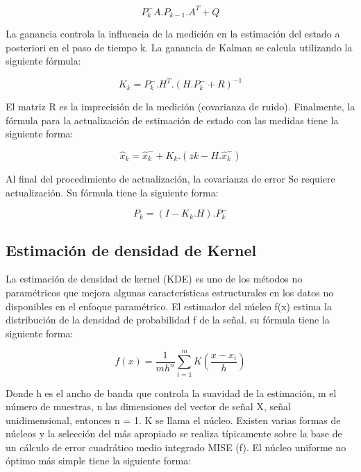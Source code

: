 \documentclass[10pt,a4paper]{article}
\begin{document}
\begin{equation}
P_{k}^{-} A.P_{k-1}.A^{T}+Q
\end{equation}

La ganancia controla la influencia de la medición en la estimación del estado a posteriori en el paso de tiempo k. La ganancia de Kalman se calcula utilizando la siguiente fórmula:

\begin{equation}
K_{k}=P_{k}^{-}.H^{T}.(H.P_{k}^{-}+R)^{-1}
\end{equation}

El matriz R es la imprecisión de la medición (covarianza de ruido).  Finalmente, la fórmula para la actualización de estimación de estado con las medidas tiene la siguiente forma:

\begin{equation}
\widehat{x}_{k} = \widehat{x} _{k}^{-} + K_{k}.(zk-H.\widehat{x}_{k}^{-})
\end{equation}

Al final del procedimiento de actualización, la covarianza de error
Se requiere actualización. Su fórmula tiene la siguiente forma:

\begin{equation}
P_{k}=(I-K_{k}.H).P_{k}^{-}
\end{equation}


\subsection{Estimación de densidad de Kernel }

La estimación de densidad de kernel (KDE) es uno de los métodos no paramétricos que mejora algunas características estructurales en los datos no disponibles en el enfoque paramétrico. El estimador del núcleo f(x) estima la distribución de la densidad de probabilidad f de la señal. su fórmula tiene la siguiente forma:

\begin{equation}
\widehat{f}(x)= \frac{1}{mh^{n}}\sum_{i=1}^{m} K(\frac{x-x_{i}}{h})
\end{equation}

Donde h es el ancho de banda que controla la suavidad de la estimación, m el número de muestras, n las dimensiones del vector de señal X, señal unidimensional, entonces n = 1. K se llama el núcleo. Existen varias formas de núcleos y la selección del más apropiado se realiza típicamente sobre la base de un cálculo de error cuadrático medio integrado MISE (f). El núcleo uniforme no óptimo más simple tiene la siguiente forma:
\end{document}

